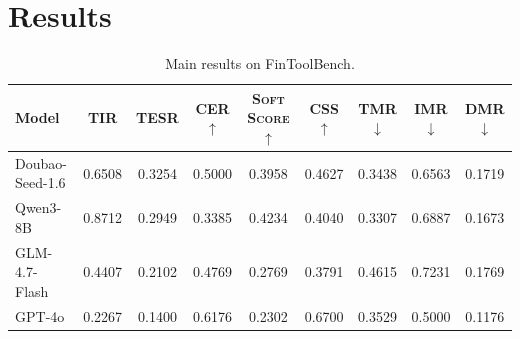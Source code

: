 \documentclass[sigconf,nonacm]{acmart}
\newcommand{\tir}{\textsc{TIR}\xspace}
\newcommand{\tesr}{\textsc{TESR}\xspace}
\newcommand{\cer}{\textsc{CER}\xspace}
\newcommand{\soft}{\textsc{Soft Score}\xspace}
\newcommand{\css}{\textsc{CSS}\xspace}
\newcommand{\tmr}{\textsc{TMR}\xspace}
\newcommand{\imr}{\textsc{IMR}\xspace}
\newcommand{\dmr}{\textsc{DMR}\xspace}
\begin{document}
\section{Results}
\label{sec:results}

\begin{table}[htbp]
\centering
\caption{Main results on FinToolBench.}
\label{tab:main_results}
\small
\begin{tabular*}{\textwidth}{@{}@{\extracolsep{\fill}}lcccccccc@{}}
\toprule
Model & \tir & \tesr & \cer$\uparrow$ & \soft$\uparrow$ & \css$\uparrow$ & \tmr$\downarrow$ & \imr$\downarrow$ & \dmr$\downarrow$ \\
\midrule
Doubao-Seed-1.6 & 0.6508 & 0.3254 & 0.5000 & 0.3958 & 0.4627 & 0.3438 & 0.6563 & 0.1719 \\
Qwen3-8B        & 0.8712 & 0.2949 & 0.3385 & 0.4234 & 0.4040 & 0.3307 & 0.6887 & 0.1673 \\
GLM-4.7-Flash   & 0.4407 & 0.2102 & 0.4769 & 0.2769 & 0.3791 & 0.4615 & 0.7231 & 0.1769 \\
GPT-4o          & 0.2267 & 0.1400 & 0.6176 & 0.2302 & 0.6700 & 0.3529 & 0.5000 & 0.1176 \\
\bottomrule
\end{tabular*}
\end{table}
\end{document}
